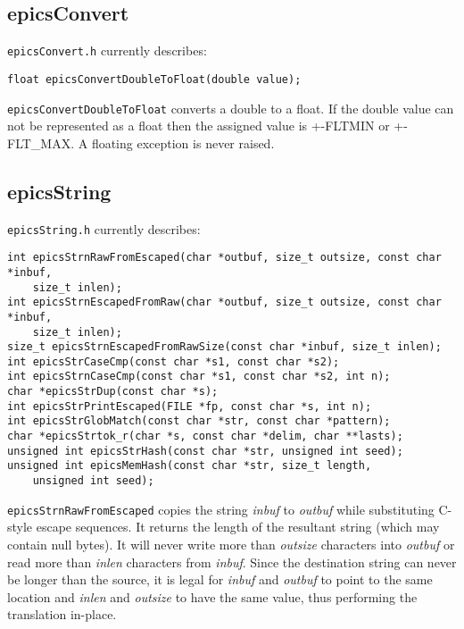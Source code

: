 \subsection{epicsConvert}

\verb|epicsConvert.h| currently describes:

\begin{verbatim}
float epicsConvertDoubleToFloat(double value);
\end{verbatim}

\verb|epicsConvertDoubleToFloat| converts a double to a float. If the double value can not be represented as a float 
then the assigned value is +-FLTMIN or +- FLT\_MAX. A floating exception is never raised.

\subsection{epicsString}

\verb|epicsString.h| currently describes:

\begin{verbatim}
int epicsStrnRawFromEscaped(char *outbuf, size_t outsize, const char *inbuf,
    size_t inlen);
int epicsStrnEscapedFromRaw(char *outbuf, size_t outsize, const char *inbuf,
    size_t inlen);
size_t epicsStrnEscapedFromRawSize(const char *inbuf, size_t inlen);
int epicsStrCaseCmp(const char *s1, const char *s2);
int epicsStrnCaseCmp(const char *s1, const char *s2, int n);
char *epicsStrDup(const char *s);
int epicsStrPrintEscaped(FILE *fp, const char *s, int n);
int epicsStrGlobMatch(const char *str, const char *pattern);
char *epicsStrtok_r(char *s, const char *delim, char **lasts);
unsigned int epicsStrHash(const char *str, unsigned int seed);
unsigned int epicsMemHash(const char *str, size_t length,
    unsigned int seed);
\end{verbatim}

\verb|epicsStrnRawFromEscaped| copies the string \emph{inbuf} to \emph{outbuf} while substituting C-style escape sequences. It returns 
the length of the resultant string (which may contain null bytes). It will never write more than \emph{outsize} characters into 
\emph{outbuf} or read more than \emph{inlen} characters from \emph{inbuf}. Since the destination string can never be longer than the source, it is 
legal for \emph{inbuf} and \emph{outbuf} to point to the same location and \emph{inlen} and \emph{outsize} to have the same value, thus performing the 
translation in-place.

